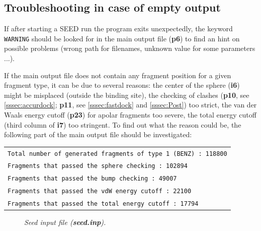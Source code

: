 \documentclass[a4paper,12pt,titlepage]{article}
\begin{document}
\subsection{Troubleshooting in case of empty output}

If after starting a SEED run the program exits unexpectedly, the keyword {\tt WARNING} should be 
looked for in the main output file ({\bf p6}) to find an hint on possible problems (wrong path for filenames, 
unknown value for some parameters ...).

\noindent
If the main output file does not contain any fragment position for a given fragment type, it can 
be due to several reasons: the center of the sphere ({\bf i6}) might be misplaced 
(outside the binding site), the checking of clashes ({\bf p10}, see \ref{sssec:accurdock}; 
{\bf p11}, see \ref{sssec:fastdock} and \ref{sssec:Post}) too strict, 
the van der Waals energy cutoff ({\bf p23}) for apolar fragments too severe, 
the total energy cutoff (third column of {\bf i7}) too stringent. 
To find out what the reason could be, the following part of the main output file should 
be investigated:

\vspace{0.5cm}

\begin{tabular}{l}
{\tt Total number of generated fragments of type 1 (BENZ) : 118800} \\%
{\tt Fragments that passed the sphere checking : 102894} \\%
{\tt Fragments that passed the bump checking : 49007} \\%
{\tt Fragments that passed the vdW energy cutoff : 22100} \\%
{\tt Fragments that passed the total energy cutoff : 17794}
\end{tabular}

\begin{figure}[p]
  \caption{\textit{Seed input file (\textbf{seed.inp}).}}
\end{figure}
\end{document}
